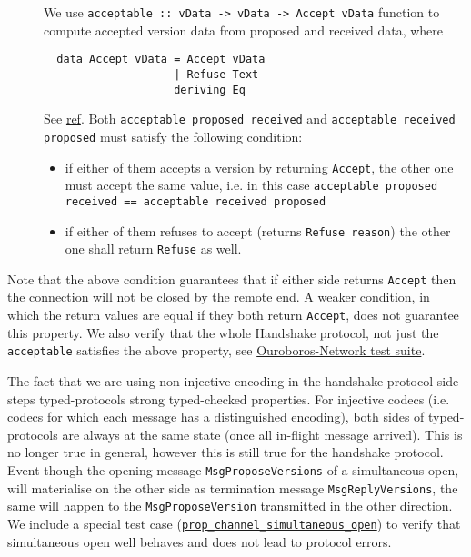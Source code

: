 \begin{description}
  \item[]
    We use \texttt{acceptable :: vData -> vData -> Accept vData}
    function to compute accepted version data from proposed and received data,
    where
\begin{verbatim}
  data Accept vData = Accept vData
                    | Refuse Text
                    deriving Eq
\end{verbatim}
    See
    \href{https://ouroboros-network.cardano.intersectmbo.org/ouroboros-network-framework/Ouroboros-Network-Protocol-Handshake-Version.html#t:Acceptable}{ref}.
    Both \texttt{acceptable proposed received} and \texttt{acceptable received
    proposed} must satisfy the following condition:
    \begin{itemize}
      \item if either of them accepts a version by returning \texttt{Accept},
        the other one must accept the same value, i.e. in this case
        \texttt{acceptable proposed received == acceptable received proposed}
      \item if either of them refuses to accept (returns \texttt{Refuse reason})
        the other one shall return \texttt{Refuse} as well.
    \end{itemize}
\end{description}
Note that the above condition guarantees that if either side returns
\texttt{Accept} then the connection will not be closed by the remote end.
A weaker condition, in which the return values are equal if they both return
\texttt{Accept}, does not guarantee this property.  We also verify that the
whole Handshake protocol, not just the \texttt{acceptable} satisfies the above
property, see
\href{https://github.com/intersectmbo/ouroboros-network/blob/master/ouroboros-network/protocol-tests/Ouroboros/Network/Protocol/Handshake/Test.hs}{Ouroboros-Network
test suite}.

The fact that we are using non-injective encoding in the handshake protocol
side steps typed-protocols strong typed-checked properties.  For injective
codecs (i.e. codecs for which each message has a distinguished encoding), both
sides of typed-protocols are always at the same state (once all in-flight
message arrived).  This is no longer true in general, however this is still
true for the handshake protocol.  Event though the opening message
\texttt{MsgProposeVersions} of a simultaneous open, will materialise on the
other side as termination message \texttt{MsgReplyVersions}, the same will
happen to the \texttt{MsgProposeVersion} transmitted in the other direction.
We include a special test case
(\href{https://github.com/intersectmbo/ouroboros-network/blob/master/ouroboros-network/protocol-tests/Ouroboros/Network/Protocol/Handshake/Test.hs\#L551}{\texttt{prop\_channel\_simultaneous\_open}})
to verify that simultaneous open well behaves and does not lead to protocol
errors.


